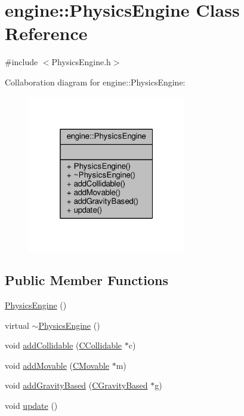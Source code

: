 \hypertarget{classengine_1_1PhysicsEngine}{\section{engine\-:\-:Physics\-Engine Class Reference}
\label{classengine_1_1PhysicsEngine}
}


{\ttfamily \#include $<$Physics\-Engine.\-h$>$}



Collaboration diagram for engine\-:\-:Physics\-Engine\-:
\nopagebreak
\begin{figure}[H]
\begin{center}
\leavevmode
\includegraphics[width=196pt]{classengine_1_1PhysicsEngine__coll__graph}
\end{center}
\end{figure}
\subsection*{Public Member Functions}
\begin{DoxyCompactItemize}
\item 
\hyperlink{classengine_1_1PhysicsEngine_a14c98b9b2eae12bff267b99df27ac9fc}{Physics\-Engine} ()
\item 
virtual \hyperlink{classengine_1_1PhysicsEngine_a7b708ba5517fdd9cc95c977dde7ff4ab}{$\sim$\-Physics\-Engine} ()
\item 
void \hyperlink{classengine_1_1PhysicsEngine_a609b1b5b818d7865c9b20abfe07e26e8}{add\-Collidable} (\hyperlink{classengine_1_1CCollidable}{C\-Collidable} $\ast$c)
\item 
void \hyperlink{classengine_1_1PhysicsEngine_a32690f48a5df0b98c5f326c0b11414ba}{add\-Movable} (\hyperlink{classengine_1_1CMovable}{C\-Movable} $\ast$m)
\item 
void \hyperlink{classengine_1_1PhysicsEngine_a9bad0bea60bde295662e6768ac08e2a9}{add\-Gravity\-Based} (\hyperlink{classengine_1_1CGravityBased}{C\-Gravity\-Based} $\ast$g)
\item 
void \hyperlink{classengine_1_1PhysicsEngine_a468ef9599ccd80e7e5c170d741ab1d21}{update} ()
\end{DoxyCompactItemize}


